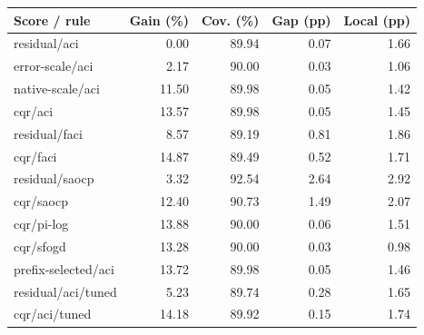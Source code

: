 \begin{tabular}{lrrrr}
\toprule
Score / rule & Gain (\%) & Cov. (\%) & Gap (pp) & Local (pp) \\
\midrule
residual/aci & 0.00 & 89.94 & 0.07 & 1.66 \\
error-scale/aci & 2.17 & 90.00 & 0.03 & 1.06 \\
native-scale/aci & 11.50 & 89.98 & 0.05 & 1.42 \\
cqr/aci & 13.57 & 89.98 & 0.05 & 1.45 \\
residual/faci & 8.57 & 89.19 & 0.81 & 1.86 \\
cqr/faci & 14.87 & 89.49 & 0.52 & 1.71 \\
residual/saocp & 3.32 & 92.54 & 2.64 & 2.92 \\
cqr/saocp & 12.40 & 90.73 & 1.49 & 2.07 \\
cqr/pi-log & 13.88 & 90.00 & 0.06 & 1.51 \\
cqr/sfogd & 13.28 & 90.00 & 0.03 & 0.98 \\
prefix-selected/aci & 13.72 & 89.98 & 0.05 & 1.46 \\
residual/aci/tuned & 5.23 & 89.74 & 0.28 & 1.65 \\
cqr/aci/tuned & 14.18 & 89.92 & 0.15 & 1.74 \\
\bottomrule
\end{tabular}